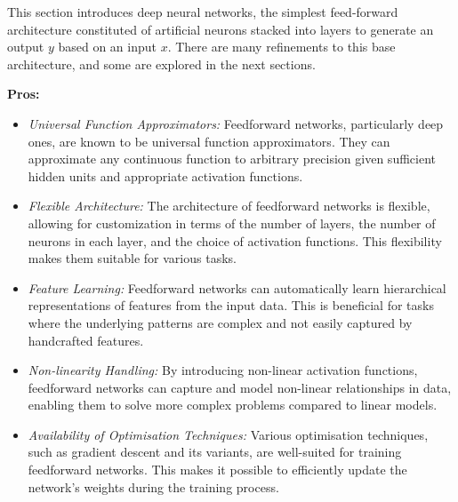 This section introduces deep neural networks, the simplest feed-forward architecture constituted of artificial neurons stacked into layers to generate an output $y$ based on an input $x$. There are many refinements to this base architecture, and some are explored in the next sections. 

\textbf{Pros:}
\begin{itemize}
    \item \textit{Universal Function Approximators:}
    Feedforward networks, particularly deep ones, are known to be universal function approximators. They can approximate any continuous function to arbitrary precision given sufficient hidden units and appropriate activation functions.
    \item \textit{Flexible Architecture:} The architecture of feedforward networks is flexible, allowing for customization in terms of the number of layers, the number of neurons in each layer, and the choice of activation functions. This flexibility makes them suitable for various tasks.
    \item \textit{Feature Learning:} Feedforward networks can automatically learn hierarchical representations of features from the input data. This is beneficial for tasks where the underlying patterns are complex and not easily captured by handcrafted features.
    \item \textit{Non-linearity Handling:} By introducing non-linear activation functions, feedforward networks can capture and model non-linear relationships in data, enabling them to solve more complex problems compared to linear models.
    \item \textit{Availability of Optimisation Techniques:} Various optimisation techniques, such as gradient descent and its variants, are well-suited for training feedforward networks. This makes it possible to efficiently update the network's weights during the training process.
\end{itemize}

